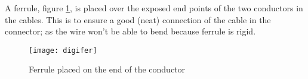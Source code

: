 A ferrule, figure \ref{fig:digi:fer}, is placed over the exposed end points of the two conductors in the cables. This is to ensure a good (neat) connection of the cable in the connector; as the wire won't be able to bend because ferrule is rigid. 
\begin{figure}[htbp]
	\centering
	\texttt{[image: digifer]}
	\caption{Ferrule placed on the end of the conductor}
	\label{fig:digi:fer}
\end{figure}    